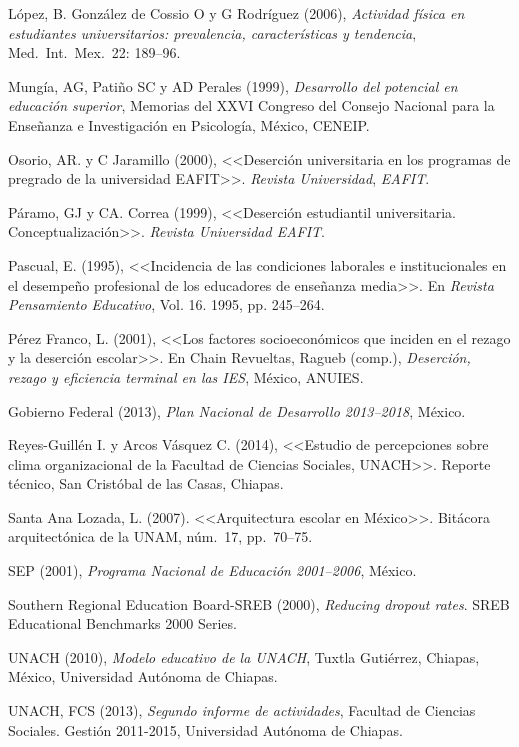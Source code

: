  
López, B. González de Cossio O y G Rodríguez (2006), \textit{Actividad
física en estudiantes universitarios: prevalencia, características y
tendencia}, Med.\ Int.\ Mex.\ 22: 189--96.

 
Mungía, AG, Patiño SC y AD Perales (1999), \textit{Desarrollo del potencial en
educación superior}, Memorias del XXVI  Congreso del Consejo
Nacional para la Enseñanza e Investigación en Psicología,  México, CENEIP.

 
Osorio, AR. y C Jaramillo (2000), <<Deserción universitaria en los programas
de pregrado de la universidad EAFIT>>. \textit{Revista Universidad},
\textit{EAFIT}.

 
Páramo, GJ y CA. Correa (1999), <<Deserción estudiantil universitaria.
Conceptualización>>. \textit{Revista Universidad EAFIT}.

 
Pascual, E. (1995), <<Incidencia de las condiciones laborales e
institucionales en el desempeño profesional de los educadores de enseñanza
media>>. En \textit{Revista Pensamiento Educativo}, Vol. 16. 1995, pp.
245--264.

 
Pérez Franco, L. (2001), <<Los factores socioeconómicos que inciden en el
rezago y la deserción escolar>>. En Chain Revueltas, Ragueb (comp.),
\textit{Deserción, rezago y eficiencia terminal en las IES}, México,
ANUIES.

 
Gobierno Federal (2013), \textit{Plan Nacional de Desarrollo 2013--2018},
México.


\begin{sloppypar}  
Reyes-Guillén I. y Arcos Vásquez C. (2014), <<Estudio de percepciones sobre
clima organizacional de la Facultad de Ciencias Sociales, UNACH>>.
Reporte técnico, San Cristóbal de las Casas, Chiapas.
\end{sloppypar} 
 
Santa Ana Lozada, L. (2007). <<Arquitectura escolar en
México>>. Bitácora arquitectónica de la UNAM, núm.\ 17, pp.\ 70--75.

 
SEP (2001), \textit{Programa Nacional de Educación 2001--2006}, México.

 
Southern Regional Education Board-SREB (2000), \textit{Reducing dropout rates}.
SREB Educational Benchmarks 2000 Series.


\begin{sloppypar}  
UNACH (2010), \textit{Modelo educativo de la UNACH}, Tuxtla Gutiérrez, Chiapas, México, Universidad Autónoma de Chiapas. 
\end{sloppypar} 

\begin{sloppypar} 
UNACH, FCS (2013), \textit{Segundo informe de actividades}, Facultad de
Ciencias Sociales. Gestión 2011-2015, Universidad Autónoma de Chiapas.
\end{sloppypar}

